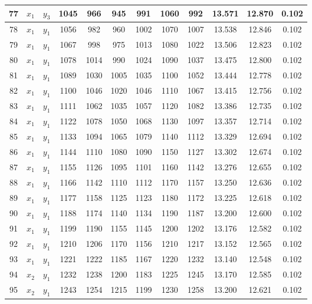 \begin{longtable}[H]{c|c|c|c|c|c|c|c|c|c|c|c|}
    77 & $x_1$ & $y_3$ & 1045 & 966 & 945 & 991 & 1060 & 992 & 13.571 & 12.870 & 0.102 \\ \hline
    78 & $x_1$ & $y_1$ & 1056 & 982 & 960 & 1002 & 1070 & 1007 & 13.538 & 12.846 & 0.102 \\ \hline
    79 & $x_1$ & $y_1$ & 1067 & 998 & 975 & 1013 & 1080 & 1022 & 13.506 & 12.823 & 0.102 \\ \hline
    80 & $x_1$ & $y_1$ & 1078 & 1014 & 990 & 1024 & 1090 & 1037 & 13.475 & 12.800 & 0.102 \\ \hline
    81 & $x_1$ & $y_1$ & 1089 & 1030 & 1005 & 1035 & 1100 & 1052 & 13.444 & 12.778 & 0.102 \\ \hline
    82 & $x_1$ & $y_1$ & 1100 & 1046 & 1020 & 1046 & 1110 & 1067 & 13.415 & 12.756 & 0.102 \\ \hline
    83 & $x_1$ & $y_1$ & 1111 & 1062 & 1035 & 1057 & 1120 & 1082 & 13.386 & 12.735 & 0.102 \\ \hline
    84 & $x_1$ & $y_1$ & 1122 & 1078 & 1050 & 1068 & 1130 & 1097 & 13.357 & 12.714 & 0.102 \\ \hline
    85 & $x_1$ & $y_1$ & 1133 & 1094 & 1065 & 1079 & 1140 & 1112 & 13.329 & 12.694 & 0.102 \\ \hline
    86 & $x_1$ & $y_1$ & 1144 & 1110 & 1080 & 1090 & 1150 & 1127 & 13.302 & 12.674 & 0.102 \\ \hline
    87 & $x_1$ & $y_1$ & 1155 & 1126 & 1095 & 1101 & 1160 & 1142 & 13.276 & 12.655 & 0.102 \\ \hline
    88 & $x_1$ & $y_1$ & 1166 & 1142 & 1110 & 1112 & 1170 & 1157 & 13.250 & 12.636 & 0.102 \\ \hline
    89 & $x_1$ & $y_1$ & 1177 & 1158 & 1125 & 1123 & 1180 & 1172 & 13.225 & 12.618 & 0.102 \\ \hline
    90 & $x_1$ & $y_1$ & 1188 & 1174 & 1140 & 1134 & 1190 & 1187 & 13.200 & 12.600 & 0.102 \\ \hline
    91 & $x_1$ & $y_1$ & 1199 & 1190 & 1155 & 1145 & 1200 & 1202 & 13.176 & 12.582 & 0.102 \\ \hline
    92 & $x_1$ & $y_1$ & 1210 & 1206 & 1170 & 1156 & 1210 & 1217 & 13.152 & 12.565 & 0.102 \\ \hline
    93 & $x_1$ & $y_1$ & 1221 & 1222 & 1185 & 1167 & 1220 & 1232 & 13.140 & 12.548 & 0.102 \\ \hline
    94 & $x_2$ & $y_1$ & 1232 & 1238 & 1200 & 1183 & 1225 & 1245 & 13.170 & 12.585 & 0.102 \\ \hline
    95 & $x_2$ & $y_1$ & 1243 & 1254 & 1215 & 1199 & 1230 & 1258 & 13.200 & 12.621 & 0.102 \\ \hline

\end{longtable}
